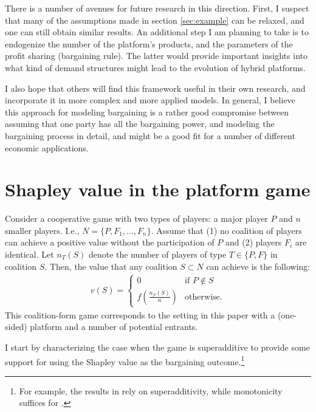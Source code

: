 \documentclass[a4paper]{article}
\begin{document}
There is a number of avenues for future research in this direction.
First, I suspect that many of the assumptions made in section \cref{sec:example} can be relaxed, and one can still obtain similar results.
An additional step I am planning to take is to endogenize the number of the platform's products, and the parameters of the profit sharing (bargaining rule).
The latter would provide important insights into what kind of demand structures might lead to the evolution of hybrid platforms.

I also hope that others will find this framework useful in their own research, and incorporate it in more complex and more applied models.
In general, I believe this approach for modeling bargaining is a rather good compromise between assuming that one party has all the bargaining power, and modeling the bargaining process in detail, and might be a good fit for a number of different economic applications.


\appendix

\printbibliography


\section{Shapley value in the platform game}
\label{app:shapley_value}

Consider a cooperative game with two types of players: a major player $P$ and $n$ smaller players.
I.e., $N = \{P, F_1, \dots, F_n\}$.
Assume that (1) no coalition of players can achieve a positive value without the participation of $P$ and (2) players $F_i$ are identical.
Let $n_T(S)$ denote the number of players of type $T \in \{P, F\}$ in coalition $S$. Then, the value that any coalition $S \subset N$ can achieve is the following:
\begin{align*}
    v(S) = \begin{cases}
        0                              & \text{if } P \notin S \\
        f\left(\frac{n_F(S)}{n}\right) & \text{otherwise}.
    \end{cases}
\end{align*}
This coalition-form game corresponds to the setting in this paper with a (one-sided) platform and a number of potential entrants.

I start by characterizing the case when the game is superadditive to provide some support for using the Shapley value as the bargaining outcome.\footnote{For example, the results in \textcite{gul1989bargaining} rely on superadditivity, while monotonicity suffices for \textcite[]{hart1996bargaining}.}
\end{document}

